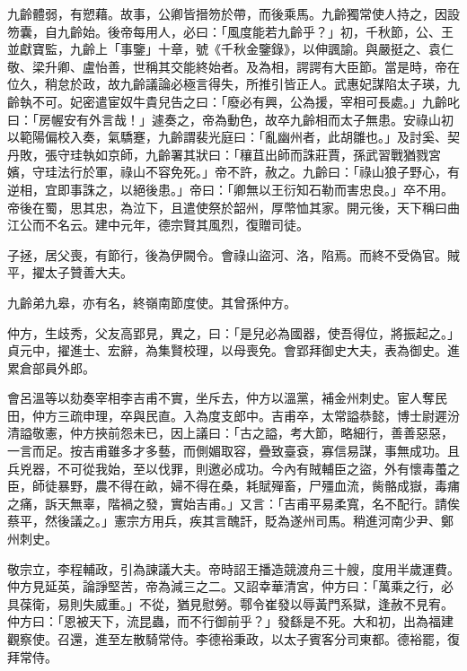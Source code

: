 \begin{pinyinscope}
 九齡體弱，有愬藉。故事，公卿皆搢笏於帶，而後乘馬。九齡獨常使人持之，因設笏囊，自九齡始。後帝每用人，必曰：「風度能若九齡乎？」初，千秋節，公、王並獻寶監，九齡上「事鑒」十章，號《千秋金鑒錄》，以伸諷諭。與嚴挺之、袁仁敬、梁升卿、盧怡善，世稱其交能終始者。及為相，諤諤有大臣節。當是時，帝在位久，稍怠於政，故九齡議論必極言得失，所推引皆正人。武惠妃謀陷太子瑛，九齡執不可。妃密遣宦奴牛貴兒告之曰：「廢必有興，公為援，宰相可長處。」九齡叱曰：「房幄安有外言哉！」遽奏之，帝為動色，故卒九齡相而太子無患。安祿山初以範陽偏校入奏，氣驕蹇，九齡謂裴光庭曰：「亂幽州者，此胡雛也。」及討奚、契丹敗，張守珪執如京師，九齡署其狀曰：「穰苴出師而誅莊賈，孫武習戰猶戮宮嬪，守珪法行於軍，祿山不容免死。」帝不許，赦之。九齡曰：「祿山狼子野心，有逆相，宜即事誅之，以絕後患。」帝曰：「卿無以王衍知石勒而害忠良。」卒不用。帝後在蜀，思其忠，為泣下，且遣使祭於韶州，厚幣恤其家。開元後，天下稱曰曲江公而不名云。建中元年，德宗賢其風烈，復贈司徒。



 子拯，居父喪，有節行，後為伊闕令。會祿山盜河、洛，陷焉。而終不受偽官。賊平，擢太子贊善大夫。



 九齡弟九皋，亦有名，終嶺南節度使。其曾孫仲方。



 仲方，生歧秀，父友高郢見，異之，曰：「是兒必為國器，使吾得位，將振起之。」貞元中，擢進士、宏辭，為集賢校理，以母喪免。會郢拜御史大夫，表為御史。進累倉部員外郎。



 會呂溫等以劾奏宰相李吉甫不實，坐斥去，仲方以溫黨，補金州刺史。宦人奪民田，仲方三疏申理，卒與民直。入為度支郎中。吉甫卒，太常謚恭懿，博士尉遲汾清謚敬憲，仲方挾前怨未已，因上議曰：「古之謚，考大節，略細行，善善惡惡，一言而足。按吉甫雖多才多藝，而側媚取容，疊致臺袞，寡信易謀，事無成功。且兵兇器，不可從我始，至以伐罪，則邀必成功。今內有賊輔臣之盜，外有懷毒蠆之臣，師徒暴野，農不得在畝，婦不得在桑，耗賦殫畜，尸殭血流，胔骼成嶽，毒痡之痛，訴天無辜，階禍之發，實始吉甫。」又言：「吉甫平易柔寬，名不配行。請俟蔡平，然後議之。」憲宗方用兵，疾其言醜訐，貶為遂州司馬。稍進河南少尹、鄭州刺史。



 敬宗立，李程輔政，引為諫議大夫。帝時詔王播造競渡舟三十艘，度用半歲運費。仲方見延英，論諍堅苦，帝為減三之二。又詔幸華清宮，仲方曰：「萬乘之行，必具葆衛，易則失威重。」不從，猶見慰勞。鄠令崔發以辱黃門系獄，逢赦不見宥。仲方曰：「恩被天下，流昆蟲，而不行御前乎？」發繇是不死。大和初，出為福建觀察使。召還，進至左散騎常侍。李德裕秉政，以太子賓客分司東都。德裕罷，復拜常侍。




\end{pinyinscope}
